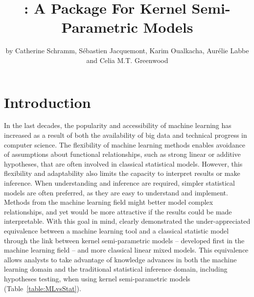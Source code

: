 \title{: A Package For Kernel Semi-Parametric Models} %
\author{by Catherine Schramm, Sébastien Jacquemont, Karim Oualkacha, Aurélie Labbe and Celia M.T. Greenwood}

\maketitle


\section{Introduction}


In the last decades, the popularity and accessibility of machine learning has increased as a result of both the availability of big data and technical progress in computer science. The flexibility of machine learning methods enables avoidance of assumptions about functional relationships, such as strong linear or additive hypotheses, that are often involved in classical statistical models. However, this flexibility and adaptability also limits the capacity to interpret results or make inference. When understanding and inference are required, simpler statistical models are often preferred, as they are easy to understand and implement. Methods from the machine learning field might better model complex relationships, and yet would be more attractive if the results could be made interpretable. With this goal in mind, \cite{liu2007semiparametric} clearly demonstrated the under-appreciated equivalence between a machine learning tool and a classical statistic model through the link between kernel semi-parametric models -- developed first in the machine learning field -- and more classical linear mixed models. 
This equivalence allows analysts to take advantage of knowledge advances in both the machine learning domain and the traditional statistical inference domain, including hypotheses testing, when using kernel semi-parametric models (Table~\ref{table:MLvsStat}). 



